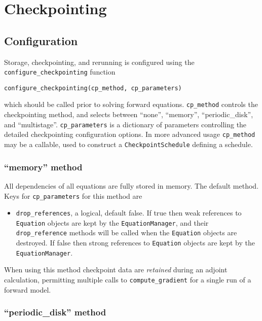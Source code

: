 \documentclass[11pt]{article}
\begin{document}
\section{Checkpointing}\label{sect:checkpointing}

\subsection{Configuration}\label{sect:configure_checkpointing}

Storage, checkpointing, and rerunning is configured using the
\texttt{configure\_checkpointing} function
\begin{lstlisting}
configure_checkpointing(cp_method, cp_parameters)
\end{lstlisting}
which should be called prior to solving forward equations. \texttt{cp\_method}
controls the checkpointing method, and selects between ``none'', ``memory'',
``periodic\_disk'', and ``multistage''. \texttt{cp\_parameters} is a dictionary
of parameters controlling the detailed checkpointing configuration options. In
more advanced usage \texttt{cp\_method} may be a callable, used to construct
a \texttt{CheckpointSchedule} defining a schedule.

\subsubsection{``memory'' method}\label{sect:configure_checkpointing_memory}

All dependencies of all equations are fully stored in memory. The default
method. Keys for \texttt{cp\_parameters} for this method are
\begin{itemize}
  \item \texttt{drop\_references}, a logical, default false. If true then weak
    references to \texttt{Equation} objects are kept by the
    \texttt{EquationManager}, and their \texttt{drop\_reference} methods will
    be called when the \texttt{Equation} objects are destroyed. If false then
    strong references to \texttt{Equation} objects are kept by the
    \texttt{EquationManager}.
\end{itemize}

When using this method checkpoint data are \emph{retained} during an adjoint
calculation, permitting multiple calls to \texttt{compute\_gradient} for a
single run of a forward model.

\subsubsection{``periodic\_disk'' method}
\end{document}
